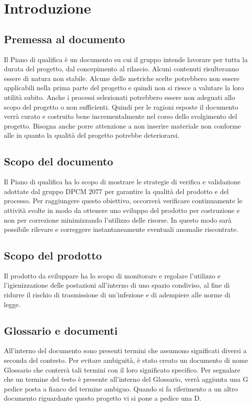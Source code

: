 \section{Introduzione}

\subsection{Premessa al documento}
Il Piano di qualifica è un documento su cui il gruppo intende lavorare per tutta la durata del progetto, dal concepimento al rilascio.
Alcuni contenuti risulteranno essere di natura non stabile. Alcune delle metriche scelte potrebbero non essere applicabili nella prima parte del progetto e quindi non si riesce a valutare la loro utilità subito.
Anche i processi selezionati potrebbero essere non adeguati allo scopo del progetto o non sufficienti. Quindi per le ragioni esposte il documento verrà curato e costruito bene incrementalmente nel corso 
dello svolgimento del progetto. Bisogna anche porre attenzione a non inserire materiale non conforme alle  in quanto la qualità del progetto potrebbe deteriorarsi.

\subsection{Scopo del documento}
Il Piano di qualifica ha lo scopo di mostrare le strategie di verifica e validazione adottate dal gruppo DPCM 2077 per garantire la qualità del prodotto e del processo. 
Per raggiungere questo obiettivo, occorrerà verificare continuamente le attività svolte in modo da ottenere uno sviluppo del prodotto per costruzione e non per correzione minimizzando l’utilizzo delle risorse.
In questo modo sarà possibile rilevare e correggere instantaneamente eventuali anomalie riscontrate.

\subsection{Scopo del prodotto}
Il prodotto da sviluppare ha lo scopo di monitorare e regolare l'utilizzo e l'igienizzazione delle postazioni all'interno di uno spazio condiviso, al fine di ridurre il rischio di trasmissione di un'infezione e di adempiere alle norme di legge. 
\subsection{Glossario e documenti} 
All'interno del  documento sono presenti termini che assumono significati diversi a seconda del contesto.
Per evitare ambiguità, è stato creato un  documento di nome Glossario che  conterrà tali termini con il loro significato specifico. Per segnalare che un termine del testo è presente all'interno del Glossario, verrà aggiunta una G pedice posta a fianco del termine ambiguo.
Quando si fa riferimento a un altro documento riguardante questo progetto vi si pone a pedice una D.

